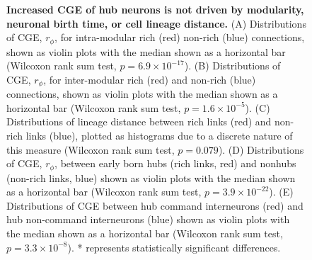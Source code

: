 {\begin{figure}[H]
 \caption{
 \textbf{Increased CGE of hub neurons is not driven by modularity, neuronal birth time, or cell lineage distance.}
(A) Distributions of CGE, $r_\phi$, for intra-modular rich (red) non-rich (blue) connections, shown as violin plots with the median shown as a horizontal bar (Wilcoxon rank sum test, $p = 6.9 \times 10^{-17}$).
(B) Distributions of CGE, $r_\phi$, for inter-modular rich (red) and non-rich (blue) connections, shown as violin plots with the median shown as a horizontal bar (Wilcoxon rank sum test, $p = 1.6 \times 10^{-5}$).
(C) Distributions of lineage distance between rich links (red) and non-rich links (blue), plotted as histograms due to a discrete nature of this measure (Wilcoxon rank sum test, $p = 0.079$).
(D) Distributions of CGE, $r_\phi$, between early born hubs (rich links, red) and nonhubs (non-rich links, blue) shown as violin plots with the median shown as a horizontal bar (Wilcoxon rank sum test, $p = 3.9 \times 10^{-22}$).
(E) Distributions of CGE between hub command interneurons (red) and hub non-command interneurons (blue) shown as violin plots with the median shown as a horizontal bar (Wilcoxon rank sum test, $p = 3.3 \times 10^{-8}$).
* represents statistically significant differences.
}
 \label{fig:Ch2Fig8}
\end{figure}


}
